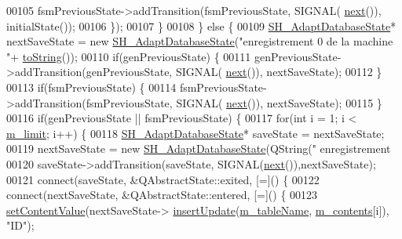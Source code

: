 \begin{DoxyCode}
00105                         fsmPreviousState->addTransition(fsmPreviousState, SIGNAL(
      \hyperlink{classSH__GenericStateMachine_af4771d31d87951c997fba1633c2d67f6}{next}()), initialState());
00106                     \});
00107                 \}
00108             \} \textcolor{keywordflow}{else} \{
00109                 \hyperlink{classSH__AdaptDatabaseState}{SH\_AdaptDatabaseState}* nextSaveState = \textcolor{keyword}{new} 
      \hyperlink{classSH__AdaptDatabaseState}{SH\_AdaptDatabaseState}(\textcolor{stringliteral}{"enregistrement 0 de la machine "}+
      \hyperlink{classSH__GenericStateMachine_a85c0c1c9d258ae991f84667412fa47cd}{toString}());
00110                 \textcolor{keywordflow}{if}(genPreviousState) \{
00111                     genPreviousState->addTransition(genPreviousState, SIGNAL(
      \hyperlink{classSH__GenericStateMachine_af4771d31d87951c997fba1633c2d67f6}{next}()), nextSaveState);
00112                 \}
00113                 \textcolor{keywordflow}{if}(fsmPreviousState) \{
00114                     fsmPreviousState->addTransition(fsmPreviousState, SIGNAL(
      \hyperlink{classSH__GenericStateMachine_af4771d31d87951c997fba1633c2d67f6}{next}()), nextSaveState);
00115                 \}
00116                 \textcolor{keywordflow}{if}(genPreviousState || fsmPreviousState) \{
00117                     \textcolor{keywordflow}{for}(\textcolor{keywordtype}{int} i = 1; i < \hyperlink{classSH__LoopingInOutStateMachine_a818a60d3691fcac11323ad114c309dcb}{m\_limit}; i++) \{
00118                         \hyperlink{classSH__AdaptDatabaseState}{SH\_AdaptDatabaseState}* saveState = nextSaveState;
00119                         nextSaveState = \textcolor{keyword}{new} \hyperlink{classSH__AdaptDatabaseState}{SH\_AdaptDatabaseState}(QString(\textcolor{stringliteral}{"
      enregistrement %
00120                         saveState->addTransition(saveState, SIGNAL(\hyperlink{classSH__GenericStateMachine_af4771d31d87951c997fba1633c2d67f6}{next}()),nextSaveState);
00121                         connect(saveState, &QAbstractState::exited, [=]() \{
00122                             connect(nextSaveState, &QAbstractState::entered, [=]() \{
00123                                 \hyperlink{classSH__InOutStateMachine_a9ab1534306b2bdb62743d4bcefe40c17}{setContentValue}(nextSaveState->
      \hyperlink{classSH__AdaptDatabaseState_a037db544ea05f42d21fcbdda758839fe}{insertUpdate}(\hyperlink{classSH__InOutStateMachine_aa009eecc5ab6181358faafb5996b6006}{m\_tableName}, \hyperlink{classSH__LoopingInOutStateMachine_a145e625dcb4d5438bd9c761eeb9425d4}{m\_contents}[i]), \textcolor{stringliteral}{"ID"});
}
\end{DoxyCode}
